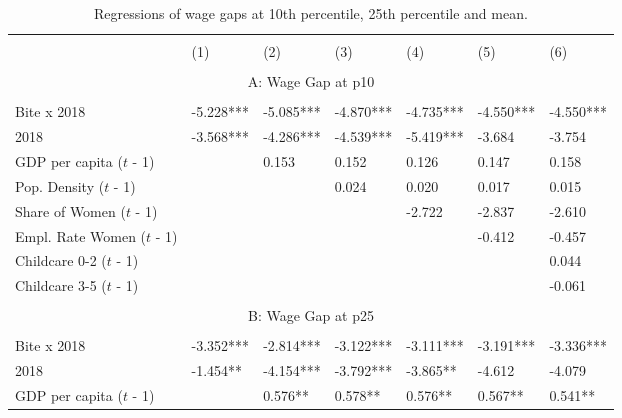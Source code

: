 \documentclass[12pt,draft,a4paper]{article}
\begin{document}
\begin{table}[htbp] %
    \caption{Regressions of wage gaps at 10th percentile, 25th percentile and mean.}
    \begin{adjustbox}{width=\textwidth}
    \begin{tabular}{l@{\hskip 10ex}llllll}
    \hline & \\[-1.0em]
                              & (1)       & (2)       & (3)       & (4)       & (5)       & (6)       \\ 
    \hline & \\[-1.0em]
    \multicolumn{7}{c}{A: Wage Gap at p10}                                                            \\
    \hline & \\[-1.0em]
    Bite x 2018               & -5.228*** & -5.085*** & -4.870*** & -4.735*** & -4.550*** & -4.550*** \\
    2018                      & -3.568*** & -4.286*** & -4.539*** & -5.419*** & -3.684    & -3.754    \\
    GDP per capita ($t$ - 1)   &           & 0.153     & 0.152     & 0.126     & 0.147     & 0.158     \\
    Pop. Density ($t$ - 1)     &           &           & 0.024     & 0.020     & 0.017     & 0.015     \\
    Share of Women ($t$ - 1)   &           &           &           & -2.722    & -2.837    & -2.610    \\
    Empl. Rate Women ($t$ - 1) &           &           &           &           & -0.412    & -0.457    \\
    Childcare 0-2 ($t$ - 1)    &           &           &           &           &           & 0.044     \\
    Childcare 3-5 ($t$ - 1)    &           &           &           &           &           & -0.061    \\ 
    \hline & \\[-1.0em]
    \multicolumn{7}{c}{B: Wage Gap at p25}                                                            \\ 
    \hline & \\[-1.0em]
    Bite x 2018               & -3.352*** & -2.814*** & -3.122*** & -3.111*** & -3.191*** & -3.336*** \\
    2018                      & -1.454**  & -4.154*** & -3.792*** & -3.865**  & -4.612    & -4.079    \\
    GDP per capita ($t$ - 1)   &           & 0.576**   & 0.578**   & 0.576**   & 0.567**   & 0.541**   \\

\end{tabular}
\end{adjustbox}
\end{table}
\end{document}
